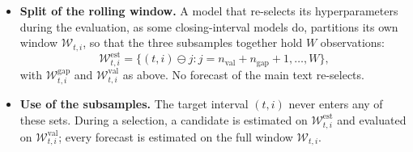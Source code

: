 \begin{itemize}
  closing-interval linear models choose theirs on pre-sample folds of the same form
  (Appendix~\ref{app:rh_closing}).
\item \textbf{Split of the rolling window.} A model that re-selects its hyperparameters during the evaluation, as
  some closing-interval models do, partitions its own window $\mathcal W_{t,i}$, so that the three subsamples together
  hold $W$ observations:
  \[
    \mathcal W^{\mathrm{est}}_{t,i} = \{(t,i) \ominus j : j = n_{\mathrm{val}} + n_{\mathrm{gap}} + 1, \dots, W\},
  \]
  with $\mathcal W^{\mathrm{gap}}_{t,i}$ and $\mathcal W^{\mathrm{val}}_{t,i}$ as above. No forecast of the main text
  re-selects.
\item \textbf{Use of the subsamples.} The target interval $(t,i)$ never enters any of these sets. During a selection,
  a candidate is estimated on $\mathcal W^{\mathrm{est}}_{t,i}$ and evaluated on $\mathcal W^{\mathrm{val}}_{t,i}$;
  every forecast is estimated on the full window $\mathcal W_{t,i}$.
\end{itemize}


